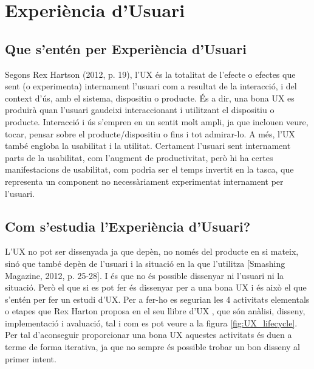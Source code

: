 
\chapter{Experiència d'Usuari}
\section{Que s'entén per Experiència d'Usuari}
Segons Rex Hartson (2012, p. 19)\cite{UX_Book}, l'\ac{UX} és la totalitat de l'efecte o efectes que sent (o experimenta) internament l'usuari com a resultat de la interacció, i del context d'ús, amb el sistema, dispositiu o producte. És a dir, una bona \ac{UX} es produirà quan l'usuari gaudeixi interaccionant i utilitzant el dispositiu o producte. Interacció i ús s'empren en un sentit molt ampli, ja que inclouen veure, tocar, pensar sobre el producte/dispositiu o fins i tot admirar-lo. 
A més, l'\ac{UX} també engloba la usabilitat i la utilitat. Certament l'usuari sent internament parts de la usabilitat, com l'augment de productivitat, però hi ha certes manifestacions de usabilitat, com podria ser el temps invertit en la tasca, que representa un component no necessàriament experimentat internament per l'usuari.

\section{Com s'estudia l'Experiència d'Usuari?}
L'\ac{UX} no pot ser dissenyada ja que depèn, no només del producte en si mateix, sinó que també depèn de l'usuari i la situació en la que l'utilitza [Smashing Magazine, 2012, p. 25-28]\cite{Smashing_User_Experience_Design}. I és que no és possible dissenyar ni l'usuari ni la situació. Però el que si es pot fer és dissenyar per a una bona \ac{UX} i és això el que s'entén per fer un estudi d'\ac{UX}. Per a fer-ho es segurian les 4 activitats elementals o etapes que Rex Harton proposa en el seu llibre d'\ac{UX} \cite{UX_Book}, que són anàlisi, disseny, implementació i avaluació, tal i com es pot veure a la figura \ref{fig:UX_lifecycle}. Per tal d'aconseguir proporcionar una bona \ac{UX} aquestes activitats és duen a terme de forma iterativa, ja que no sempre és possible trobar un bon disseny al primer intent.

